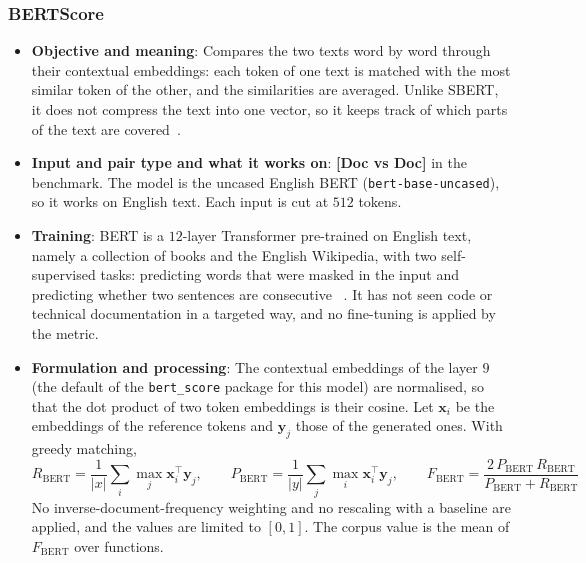 \subsubsection{BERTScore}
\label{subsubsec:bertscore}
\begin{itemize}[leftmargin=*, label=\textbullet]
	\item \textbf{Objective and meaning}: Compares the two texts word by word through their
	contextual embeddings: each token of one text is matched with the most similar token of the
	other, and the similarities are averaged. Unlike SBERT, it does not compress the text into one
	vector, so it keeps track of which parts of the text are covered~\cite{zhang_bertscore_2020}.

	\item \textbf{Input and pair type and what it works on}: \textbf{[Doc vs Doc]} in the benchmark.
	The model is the uncased English BERT (\texttt{bert-base-uncased}), so it works on English text.
	Each input is cut at $512$ tokens.

	\item \textbf{Training}: BERT is a $12$-layer Transformer pre-trained on English text, namely a
	collection of books and the English Wikipedia, with two self-supervised tasks: predicting
	words that were masked in the input and predicting whether two sentences are consecutive~%
	\cite{devlin_bert_2019}. It has not seen code or technical documentation in a targeted way, and
	no fine-tuning is applied by the metric.

	\item \textbf{Formulation and processing}: The contextual embeddings of the layer $9$ (the
	default of the \texttt{bert\_score} package for this model) are normalised, so that the dot
	product of two token embeddings is their cosine. Let $\mathbf{x}_i$ be the embeddings of the
	reference tokens and $\mathbf{y}_j$ those of the generated ones. With greedy matching,
	\begin{equation}
		R_{\mathrm{BERT}}=\frac{1}{|x|}\sum_{i}\max_{j}\mathbf{x}_i^{\top}\mathbf{y}_j,\qquad
		P_{\mathrm{BERT}}=\frac{1}{|y|}\sum_{j}\max_{i}\mathbf{x}_i^{\top}\mathbf{y}_j,\qquad
		F_{\mathrm{BERT}}=\frac{2\,P_{\mathrm{BERT}}\,R_{\mathrm{BERT}}}{P_{\mathrm{BERT}}+R_{\mathrm{BERT}}}
		\label{eq:bertscore}
	\end{equation}
	No inverse-document-frequency weighting and no rescaling with a baseline are applied, and the
	values are limited to $[0,1]$. The corpus value is the mean of $F_{\mathrm{BERT}}$ over functions.


\end{itemize}
